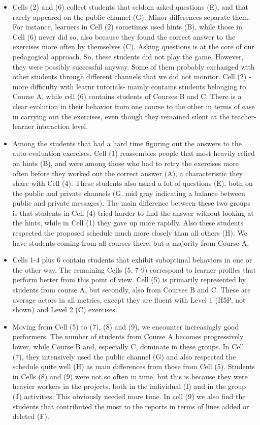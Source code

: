 \documentclass{aims} %
\theoremstyle{definition}
\begin{document}
\begin{itemize}
\item
  Cells (2) and (6) collect students that seldom asked questions (E),
  and that rarely appeared on the public channel (G). Minor differences
  separate them. For instance, learners in Cell (2) sometimes used hints
  (B), while those in Cell (6) never did so, also because they found the
  correct answer to the exercises more often by themselves (C). Asking
  questions is at the core of our pedagogical approach. So, these
  students did not play the game. However, they were possibly successful
  anyway. Some of them probably exchanged with other students through
  different channels that we did not monitor. Cell (2) -more difficulty
  with learnr tutorials- mainly contains students belonging to Course A,
  while cell (6) contains students of Courses B and C. There is a clear
  evolution in their behavior from one course to the other in terms of
  ease in carrying out the exercises, even though they remained silent
  at the teacher-learner interaction level.
\item
  Among the students that had a hard time figuring out the answers to
  the auto-evaluation exercises, Cell (1) reassembles people that most
  heavily relied on hints (B), and were among those who had to retry the
  exercises more often before they worked out the correct answer (A), a
  characteristic they share with Cell (4). These students also asked a
  lot of questions (E), both on the public and private channels (G, mid
  gray indicating a balance between public and private messages). The
  main difference between these two groups is that students in Cell (4)
  tried harder to find the answer without looking at the hints, while in
  Cell (1) they gave up more rapidly. Also these students respected the
  proposed schedule much more closely than all others (H). We have
  students coming from all courses there, but a majority from Course A.
\item
  Cells 1-4 plus 6 contain students that exhibit suboptimal behaviors in
  one or the other way. The remaining Cells (5, 7-9) correspond to
  learner profiles that perform better from this point of view. Cell (5)
  is primarily represented by students from course A, but secondly, also
  from Courses B and C. These are average actors in all metrics, except
  they are fluent with Level 1 (H5P, not shown) and Level 2 (C)
  exercises.
\item
  Moving from Cell (5) to (7), (8) and (9), we encounter increasingly
  good performers. The number of students from Course A becomes
  progressively lower, while Course B and, especially C, dominate in
  these groups. In Cell (7), they intensively used the public channel
  (G) and also respected the schedule quite well (H) as main differences
  from those from Cell (5). Students in Cells (8) and (9) were not so
  often in time, but this is because they were heavier workers in the
  projects, both in the individual (I) and in the group (J) activities.
  This obviously needed more time. In cell (9) we also find the students
  that contributed the most to the reports in terms of lines added or
  deleted (F).
\end{itemize}
\end{document}
